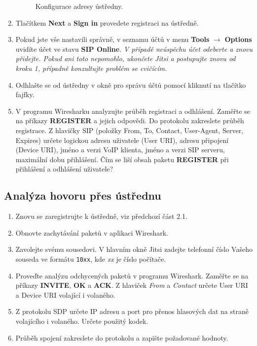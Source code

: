 \begin{enumerate}
\begin{figure}[h!]
        \caption{Konfigurace adresy ústředny.}
        \label{fig:registration2}
      \end{figure}
    \item Tlačítkem {\bf Next} a {\bf Sign in} provedete registraci na ústředně.
    \item  Pokud jste vše nastavili správně, v seznamu účtů v menu {\bf Tools} $\rightarrow$ {\bf Options} uvidíte účet ve stavu {\bf SIP Online}. {\it V případě neúspěchu účet odeberte a znovu přidejte. Pokud ani toto nepomohlo, ukončete Jitsi a postupujte znovu od kroku 1, případně konzultujte problém se cvičícím.}
    \item Odhlašte se od ústředny v okně pro správu účtů pomocí kliknutí na
      tlačítko fajfky.
    \item V programu Wiresharku analyzujte průběh registraci a odhlášení. Zaměřte se na příkazy {\bf REGISTER} a jejich odpovědi. Do protokolu zakreslete průběh registrace. Z hlavičky SIP (položky From, To, Contact, User-Agent, Server, Expires) určete logickou adresu uživatele (User URI), adresu připojení (Device URI), jméno a verzi VoIP klienta, jméno a verzi SIP serveru, maximální dobu přihlášení. Čím se liší obsah paketu {\bf REGISTER} při přihlášení a odhlášení uživatele?
\end{enumerate}

\subsection{Analýza hovoru přes ústřednu}
\begin{enumerate}
    \item Znovu se zaregistrujte k ústředně, viz předchozí část 2.1.
    \item Obnovte zachytávání paketů v aplikaci Wireshark.
    \item Zavolejte svému sousedovi. V hlavním okně Jitsi zadejte telefonní číslo Vašeho souseda ve formátu {\tt 10xx}, kde {\it xx} je číslo počítače.
    \item Proveďte analýzu odchycených paketů v programu Wireshark. Zaměřte se na příkazy {\bf INVITE}, {\bf OK} a {\bf ACK}. Z hlaviček {\it From} a {\it Contact} určete User URI a Device URI volající i volaného.
    \item Z protokolu SDP určete IP adresu a port pro přenos hlasových dat na straně volajícího i volaného. Určete použitý kodek. 
    \item Průběh spojení zakreslete do protokolu a zapište požadované hodnoty. 
\end{enumerate}


